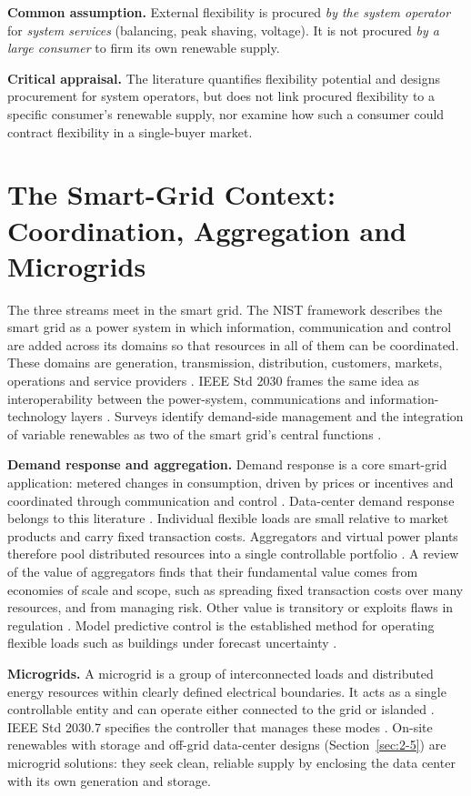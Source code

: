 \textbf{Common assumption.} External flexibility is procured \emph{by the system operator} for \emph{system services} (balancing, peak shaving, voltage). It is not procured \emph{by a large consumer} to firm its own renewable supply.

\textbf{Critical appraisal.} The literature quantifies flexibility potential and designs procurement for system operators, but does not link procured flexibility to a specific consumer's renewable supply, nor examine how such a consumer could contract flexibility in a single-buyer market.

\section{The Smart-Grid Context: Coordination, Aggregation and Microgrids}\label{sec:2-9}

The three streams meet in the smart grid. The NIST framework describes the smart grid as a power system in which information, communication and control are added across its domains so that resources in all of them can be coordinated. These domains are generation, transmission, distribution, customers, markets, operations and service providers \cite{r54}. IEEE Std 2030 frames the same idea as interoperability between the power-system, communications and information-technology layers \cite{r55}. Surveys identify demand-side management and the integration of variable renewables as two of the smart grid's central functions \cite{r56}.

\textbf{Demand response and aggregation.} Demand response is a core smart-grid application: metered changes in consumption, driven by prices or incentives and coordinated through communication and control \cite{r57}. Data-center demand response belongs to this literature \cite{r4,r5}. Individual flexible loads are small relative to market products and carry fixed transaction costs. Aggregators and virtual power plants therefore pool distributed resources into a single controllable portfolio \cite{r58}. A review of the value of aggregators finds that their fundamental value comes from economies of scale and scope, such as spreading fixed transaction costs over many resources, and from managing risk. Other value is transitory or exploits flaws in regulation \cite{r59}. Model predictive control is the established method for operating flexible loads such as buildings under forecast uncertainty \cite{r60}.

\textbf{Microgrids.} A microgrid is a group of interconnected loads and distributed energy resources within clearly defined electrical boundaries. It acts as a single controllable entity and can operate either connected to the grid or islanded \cite{r61,r62}. IEEE Std 2030.7 specifies the controller that manages these modes \cite{r63}. On-site renewables with storage and off-grid data-center designs (Section~\ref{sec:2-5}) are microgrid solutions: they seek clean, reliable supply by enclosing the data center with its own generation and storage.

